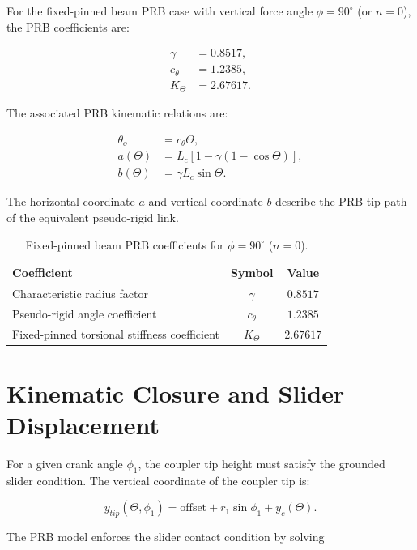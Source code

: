 \documentclass[11pt]{article}
\begin{document}
For the fixed-pinned beam PRB case with vertical force angle $\phi = 90^\circ$ (or $n = 0$), the PRB coefficients are:

\begin{align}
    \gamma &= 0.8517, \\
    c_{\theta} &= 1.2385, \\
    K_{\Theta} &= 2.67617.
\end{align}

The associated PRB kinematic relations are:

\begin{align}
    \theta_o &= c_{\theta} \Theta, \\
    a(\Theta) &= L_c \left[1 - \gamma\left(1 - \cos\Theta\right)\right], \\
    b(\Theta) &= \gamma L_c \sin\Theta.
\end{align}

The horizontal coordinate $a$ and vertical coordinate $b$ describe the PRB tip path of the equivalent pseudo-rigid link.

\begin{table}[h!]
\centering
\caption{Fixed-pinned beam PRB coefficients for $\phi = 90^\circ$ ($n = 0$).}
\begin{tabular}{lcc}
\hline
Coefficient & Symbol & Value \\
\hline
Characteristic radius factor & $\gamma$ & $0.8517$ \\
Pseudo-rigid angle coefficient & $c_{\theta}$ & $1.2385$ \\
Fixed-pinned torsional stiffness coefficient & $K_{\Theta}$ & $2.67617$ \\
\hline
\end{tabular}
\end{table}

\section{Kinematic Closure and Slider Displacement}

For a given crank angle $\phi_1$, the coupler tip height must satisfy the grounded slider condition. The vertical coordinate of the coupler tip is:

\begin{equation}
    y_{tip}(\Theta, \phi_1) = \text{offset} + r_1 \sin \phi_1 + y_c(\Theta).
\end{equation}

The PRB model enforces the slider contact condition by solving
\end{document}
